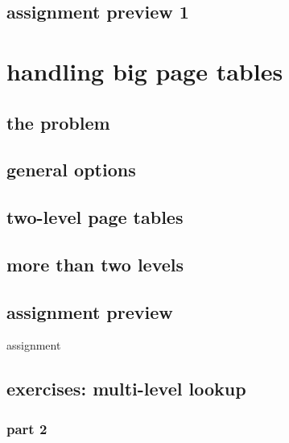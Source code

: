\subsection{assignment preview 1}



\section{handling big page tables}
\subsection{the problem}


\subsection{general options}


\subsection{two-level page tables}




\subsection{more than two levels}


\subsection{assignment preview}
\begin{frame}{assignment}
\end{frame}

\subsection{exercises: multi-level lookup}
\subsubsection{part 2}

